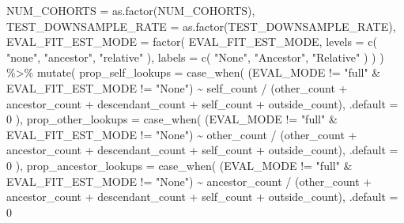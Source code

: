 \documentclass[
]{book}
\newenvironment{Shaded}{\begin{snugshade}}{\end{snugshade}}
\newcommand{\AttributeTok}[1]{\textcolor[rgb]{0.77,0.63,0.00}{#1}}
\newcommand{\DecValTok}[1]{\textcolor[rgb]{0.00,0.00,0.81}{#1}}
\newcommand{\FunctionTok}[1]{\textcolor[rgb]{0.00,0.00,0.00}{#1}}
\newcommand{\NormalTok}[1]{#1}
\newcommand{\SpecialCharTok}[1]{\textcolor[rgb]{0.00,0.00,0.00}{#1}}
\newcommand{\StringTok}[1]{\textcolor[rgb]{0.31,0.60,0.02}{#1}}
\begin{document}
\begin{Shaded}
\begin{Highlighting}[]
    \AttributeTok{NUM\_COHORTS =} \FunctionTok{as.factor}\NormalTok{(NUM\_COHORTS),}
    \AttributeTok{TEST\_DOWNSAMPLE\_RATE =} \FunctionTok{as.factor}\NormalTok{(TEST\_DOWNSAMPLE\_RATE),}
    \AttributeTok{EVAL\_FIT\_EST\_MODE =} \FunctionTok{factor}\NormalTok{(}
\NormalTok{      EVAL\_FIT\_EST\_MODE,}
      \AttributeTok{levels =} \FunctionTok{c}\NormalTok{(}
        \StringTok{"none"}\NormalTok{,}
        \StringTok{"ancestor"}\NormalTok{,}
        \StringTok{"relative"}
\NormalTok{      ),}
      \AttributeTok{labels =} \FunctionTok{c}\NormalTok{(}
        \StringTok{"None"}\NormalTok{,}
        \StringTok{"Ancestor"}\NormalTok{,}
        \StringTok{"Relative"}
\NormalTok{      )}
\NormalTok{    )}
\NormalTok{  ) }\SpecialCharTok{\%\textgreater{}\%}
  \FunctionTok{mutate}\NormalTok{(}
    \AttributeTok{prop\_self\_lookups =} \FunctionTok{case\_when}\NormalTok{(}
\NormalTok{      (EVAL\_MODE }\SpecialCharTok{!=} \StringTok{"full"} \SpecialCharTok{\&}\NormalTok{ EVAL\_FIT\_EST\_MODE }\SpecialCharTok{!=} \StringTok{"None"}\NormalTok{) }\SpecialCharTok{\textasciitilde{}}
\NormalTok{        self\_count }\SpecialCharTok{/}\NormalTok{ (other\_count }\SpecialCharTok{+}\NormalTok{ ancestor\_count }\SpecialCharTok{+}\NormalTok{ descendant\_count }\SpecialCharTok{+}\NormalTok{ self\_count }\SpecialCharTok{+}\NormalTok{ outside\_count),}
      \AttributeTok{.default =} \DecValTok{0}
\NormalTok{    ),}
    \AttributeTok{prop\_other\_lookups =}  \FunctionTok{case\_when}\NormalTok{(}
\NormalTok{      (EVAL\_MODE }\SpecialCharTok{!=} \StringTok{"full"} \SpecialCharTok{\&}\NormalTok{ EVAL\_FIT\_EST\_MODE }\SpecialCharTok{!=} \StringTok{"None"}\NormalTok{) }\SpecialCharTok{\textasciitilde{}}
\NormalTok{        other\_count }\SpecialCharTok{/}\NormalTok{ (other\_count }\SpecialCharTok{+}\NormalTok{ ancestor\_count }\SpecialCharTok{+}\NormalTok{ descendant\_count }\SpecialCharTok{+}\NormalTok{ self\_count }\SpecialCharTok{+}\NormalTok{ outside\_count),}
      \AttributeTok{.default =} \DecValTok{0}
\NormalTok{    ),}
    \AttributeTok{prop\_ancestor\_lookups =}  \FunctionTok{case\_when}\NormalTok{(}
\NormalTok{      (EVAL\_MODE }\SpecialCharTok{!=} \StringTok{"full"} \SpecialCharTok{\&}\NormalTok{ EVAL\_FIT\_EST\_MODE }\SpecialCharTok{!=} \StringTok{"None"}\NormalTok{) }\SpecialCharTok{\textasciitilde{}}
\NormalTok{        ancestor\_count }\SpecialCharTok{/}\NormalTok{ (other\_count }\SpecialCharTok{+}\NormalTok{ ancestor\_count }\SpecialCharTok{+}\NormalTok{ descendant\_count }\SpecialCharTok{+}\NormalTok{ self\_count }\SpecialCharTok{+}\NormalTok{ outside\_count),}
      \AttributeTok{.default =} \DecValTok{0}

\end{Highlighting}
\end{Shaded}
\end{document}
